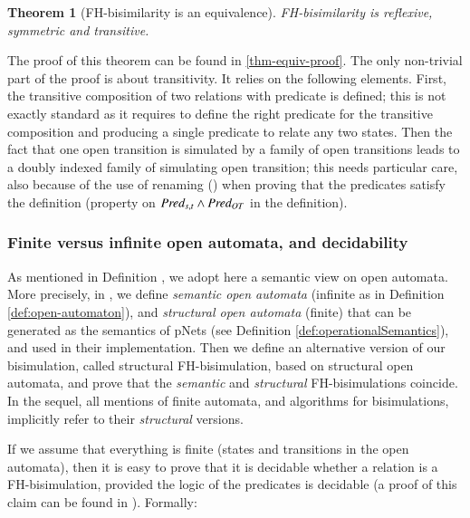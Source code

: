 \documentclass{elsarticle}
\newcommand{\TODO}[1]{\textcolor{red}{\textbf{[TODO:#1]}}}
\newtheorem{thm}{Theorem}
\begin{document}
\begin{thm}[FH-bisimilarity is an equivalence]\label{thm-equiv} FH-bisimilarity is 
reflexive, symmetric and transitive.
\end{thm}

The proof of this theorem can be found in \ref{thm-equiv-proof}. The
only non-trivial part of the proof is about transitivity. It
relies on the following elements. First,  the transitive composition
of two relations with predicate is defined; this is not exactly
standard as it requires to define the right predicate for the
transitive composition and producing a single predicate to relate any
two states. Then the fact that one open transition is simulated by a
family of open transitions leads to a doubly indexed family of
simulating open transition; this needs particular care, also because
of the use of renaming (\Post) when proving that the predicates
satisfy the definition (property on $\Pred_{s,t} \land \Pred_{OT}$ in
the definition).  


\medskip



\subsubsection*{Finite versus infinite open automata, and decidability} 
As mentioned in Definition \pageref{def:open-automaton}, we adopt here a semantic view on open automata. More precisely, in \cite{hou:hal-02406098}, we  define
\emph{semantic open automata} (infinite as in Definition \ref{def:open-automaton}),
and \emph{structural open automata} (finite) that can be generated as
the semantics of pNets (see Definition \ref{def:operationalSemantics}), and used in their implementation. Then we define
an alternative version of our bisimulation, called
structural FH-bisimulation, based on structural open automata, and
prove that the \emph{semantic} and \emph{structural} FH-bisimulations coincide.
In the sequel, all mentions of finite automata, and algorithms for
bisimulations, implicitly refer to their \emph{structural} versions.

If we assume that everything is finite (states and transitions in the
open automata), then it is easy to
prove that it is decidable whether a relation is a 
FH-bisimulation, provided the logic of the predicates is
decidable (a proof of this claim can be found in \cite{henrio:Forte2016}). Formally:
\end{document}
